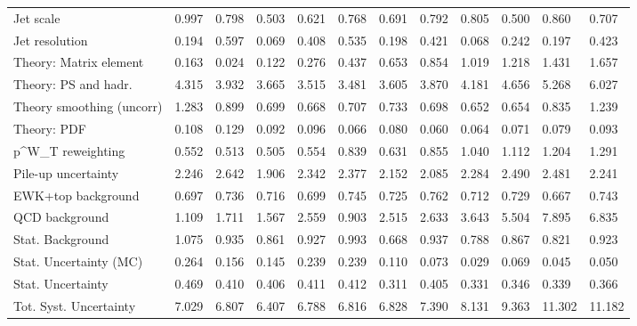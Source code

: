 \begin{tabular}{l|p{0.6cm}p{0.6cm}p{0.6cm}p{0.6cm}p{0.6cm}p{0.6cm}p{0.6cm}p{0.6cm}p{0.6cm}p{0.6cm}p{0.6cm}}
Jet scale                                & 0.997 & 0.798 & 0.503 & 0.621 & 0.768 & 0.691 & 0.792 & 0.805 & 0.500 & 0.860 & 0.707 \\
Jet resolution                           & 0.194 & 0.597 & 0.069 & 0.408 & 0.535 & 0.198 & 0.421 & 0.068 & 0.242 & 0.197 & 0.423 \\
Theory: Matrix element                   & 0.163 & 0.024 & 0.122 & 0.276 & 0.437 & 0.653 & 0.854 & 1.019 & 1.218 & 1.431 & 1.657 \\
Theory: PS and hadr.                     & 4.315 & 3.932 & 3.665 & 3.515 & 3.481 & 3.605 & 3.870 & 4.181 & 4.656 & 5.268 & 6.027 \\
Theory smoothing (uncorr)                & 1.283 & 0.899 & 0.699 & 0.668 & 0.707 & 0.733 & 0.698 & 0.652 & 0.654 & 0.835 & 1.239 \\
Theory: PDF                              & 0.108 & 0.129 & 0.092 & 0.096 & 0.066 & 0.080 & 0.060 & 0.064 & 0.071 & 0.079 & 0.093 \\
p^{W}_{T} reweighting                    & 0.552 & 0.513 & 0.505 & 0.554 & 0.839 & 0.631 & 0.855 & 1.040 & 1.112 & 1.204 & 1.291 \\
Pile-up uncertainty                      & 2.246 & 2.642 & 1.906 & 2.342 & 2.377 & 2.152 & 2.085 & 2.284 & 2.490 & 2.481 & 2.241 \\
EWK+top background                       & 0.697 & 0.736 & 0.716 & 0.699 & 0.745 & 0.725 & 0.762 & 0.712 & 0.729 & 0.667 & 0.743 \\
QCD background                           & 1.109 & 1.711 & 1.567 & 2.559 & 0.903 & 2.515 & 2.633 & 3.643 & 5.504 & 7.895 & 6.835 \\
Stat. Background                         & 1.075 & 0.935 & 0.861 & 0.927 & 0.993 & 0.668 & 0.937 & 0.788 & 0.867 & 0.821 & 0.923 \\
Stat. Uncertainty (MC)                   & 0.264 & 0.156 & 0.145 & 0.239 & 0.239 & 0.110 & 0.073 & 0.029 & 0.069 & 0.045 & 0.050 \\
\hline
Stat. Uncertainty                        & 0.469 & 0.410 & 0.406 & 0.411 & 0.412 & 0.311 & 0.405 & 0.331 & 0.346 & 0.339 & 0.366 \\
\hline
Tot. Syst. Uncertainty                   & 7.029 & 6.807 & 6.407 & 6.788 & 6.816 & 6.828 & 7.390 & 8.131 & 9.363 & 11.302 & 11.182 \\
\hline
\end{tabular}
